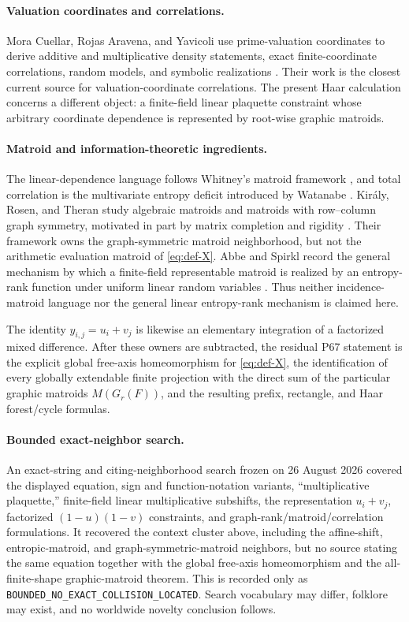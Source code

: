 \paragraph{Valuation coordinates and correlations.}
Mora Cuellar, Rojas Aravena, and Yavicoli use prime-valuation coordinates to
derive additive and multiplicative density statements, exact finite-coordinate
correlations, random models, and symbolic realizations
\citep{MoraCuellarRojasAravenaYavicoli2026}.  Their work is the closest current
source for valuation-coordinate correlations.  The present Haar calculation
concerns a different object: a finite-field linear plaquette constraint whose
arbitrary coordinate dependence is represented by root-wise graphic
matroids.

\paragraph{Matroid and information-theoretic ingredients.}
The linear-dependence language follows Whitney's matroid framework
\citep{Whitney1935}, and total correlation is the multivariate entropy deficit
introduced by Watanabe \citep{Watanabe1960}.  Kir\'aly, Rosen, and Theran study
algebraic matroids and matroids with row--column graph symmetry, motivated in
part by matrix completion and rigidity \citep{KiralyRosenTheran2013}.  Their
framework owns the graph-symmetric matroid neighborhood, but not the arithmetic
evaluation matroid of \eqref{eq:def-X}.  Abbe and Spirkl record the general
mechanism by which a finite-field representable matroid is realized by an
entropy-rank function under uniform linear random variables
\citep{AbbeSpirkl2019}.  Thus neither incidence-matroid language nor the general
linear entropy-rank mechanism is claimed here.

The identity $y_{i,j}=u_i+v_j$ is likewise an elementary integration of a
factorized mixed difference.  After these owners are subtracted, the residual
P67 statement is the explicit global free-axis homeomorphism for
\eqref{eq:def-X}, the identification of every globally extendable finite
projection with the direct sum of the particular graphic matroids $M(G_r(F))$,
and the resulting prefix, rectangle, and Haar forest/cycle formulas.

\paragraph{Bounded exact-neighbor search.}
An exact-string and citing-neighborhood search frozen on 26 August 2026
covered the displayed equation, sign and function-notation variants,
``multiplicative plaquette,'' finite-field linear multiplicative subshifts,
the representation $u_i+v_j$, factorized $(1-u)(1-v)$ constraints, and
graph-rank/matroid/correlation formulations.  It recovered the context cluster
above, including the affine-shift, entropic-matroid, and graph-symmetric-matroid
neighbors, but no source stating the same equation together with the global
free-axis homeomorphism and the all-finite-shape graphic-matroid theorem.
This is recorded only as
\texttt{BOUNDED\_NO\_EXACT\_COLLISION\_LOCATED}.  Search vocabulary may
differ, folklore may exist, and no worldwide novelty conclusion follows.

